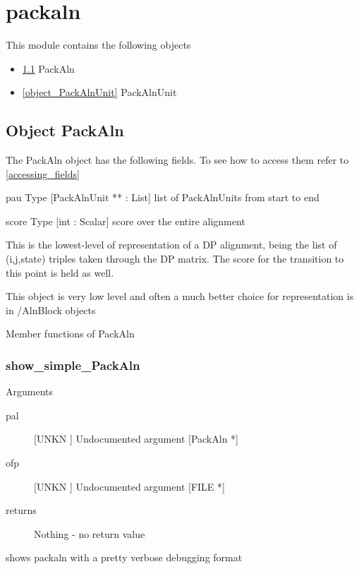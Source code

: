 \section{packaln}
\label{module_packaln}
This module contains the following objects

\begin{itemize}
\item \ref{object_PackAln} PackAln

\item \ref{object_PackAlnUnit} PackAlnUnit

\end{itemize}
\subsection{Object PackAln}

\label{object_PackAln}

The PackAln object has the following fields. To see how to access them refer to \ref{accessing_fields}
\begin{description}
\item{pau} Type [PackAlnUnit ** : List]  list of PackAlnUnits from start to end

\item{score} Type [int : Scalar]  score over the entire alignment

\end{description}
This is the lowest-level of representation
of a DP alignment, being the list of 
(i,j,state) triples taken through the
DP matrix. The score for the transition to
this point is held as well.


This object is very low level and often a
much better choice for representation is
in /AlnBlock objects 




Member functions of PackAln

\subsubsection{show_simple_PackAln}

Arguments
\begin{description}
\item[pal] [UNKN ] Undocumented argument [PackAln *]
\item[ofp] [UNKN ] Undocumented argument [FILE *]
\item[returns] Nothing - no return value
\end{description}
shows packaln with a pretty verbose debugging 
format


